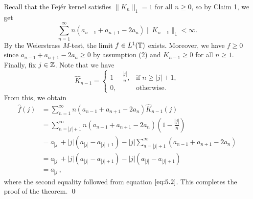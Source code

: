 Recall that the Fej\'er kernel satisfies $\|K_n\|_1 = 1$ for all $n \geq 0$, 
so by Claim 1, we get  
\[ \sum_{n=1}^\infty n(a_{n-1} + a_{n+1} - 2a_n)\|K_{n-1}\|_1 < \infty. \] 
By the Weierstrass $M$-test, the limit $f \in L^1(\mathbb{T})$ exists. 
Moreover, we have $f \geq 0$ since $a_{n-1} + a_{n+1} - 2a_n \geq 0$ by 
assumption (2) and $K_{n-1} \geq 0$ for all $n \geq 1$. Finally, 
fix $j \in \mathbb{Z}$. Note that we have 
\[ \widehat{K}_{n-1} = \begin{cases}
    1 - \frac{|j|}{n}, & \text{if } n \geq |j| + 1, \\ 
    0, & \text{otherwise.} 
\end{cases} \] 
From this, we obtain 
\begin{align*}
    \hat f(j) &= \sum_{n=1}^\infty n(a_{n-1} + a_{n+1} - 2a_n) \widehat{K}_{n-1}(j) \\ 
    &= \sum_{n=|j|+1}^\infty n(a_{n-1} + a_{n+1} - 2a_n) \left(1 - \frac{|j|}{n} \right) \\ 
    &= a_{|j|} + |j|(a_{|j|} - a_{|j|+1}) - |j| \sum_{n=|j|+1}^\infty 
    (a_{n-1} + a_{n+1} - 2a_n) \\ 
    &= a_{|j|} + |j|(a_{|j|} - a_{|j|+1}) - |j|(a_{|j|} - a_{|j|+1}) \\ 
    &= a_{|j|}, 
\end{align*}
where the second equality followed from equation $\eqref{eq:5.2}$. 
This completes the proof of the theorem. \qed 
